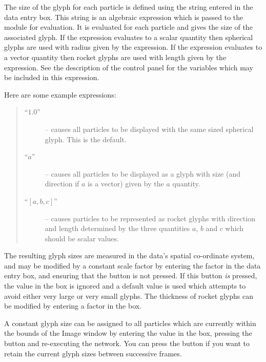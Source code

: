 \begin{description}
The size of the glyph for each particle is defined using the string
entered in the  data entry box. This string
is an algebraic expression which is passed to the  module
for evaluation. It is evaluated for each particle and gives the size of
the associated glyph. If the expression evaluates to a scalar quantity
then spherical glyphs are used with radius given by the expression. If
the expression evaluates to a vector quantity then rocket glyphs are
used with length given by the expression. See the description of the
 control panel for the variables which
may be included in this expression.

Here are some  example expressions:

\begin{quote}
\begin{description}

\item [``$1.0$'' ] -- causes all particles to be displayed with the same sized spherical glyph.
This is the default.

\item [``$a$'' ] -- causes all particles to be displayed as a glyph with size (and direction
if $a$ is a vector) given by the $a$ quantity.

\item [``\mbox{$[a,b,c]$}'' ] -- causes particles to be represented as 
rocket glyphs with
direction and length determined by the three quantities $a$, $b$ and $c$
which should be scalar values.

\end{description}
\end{quote}

The resulting glyph sizes are measured in the data's spatial co-ordinate
system, and may be modified by a constant scale factor by entering the
factor in the  data entry box, and ensuring
that the  button is not pressed. If this
button {\em is} pressed, the value in the  box is
ignored and a default value is used which attempts to avoid either very
large or very small glyphs. The thickness of rocket glyphs can be
modified by entering a factor in the  box.

A constant glyph size can be assigned to all particles which are
currently within the bounds of the Image window by entering the value in
the  box, pressing the
 button and re-executing the
network. You can press the  button if you want
to retain the current glyph sizes between successive frames.


\end{description}
